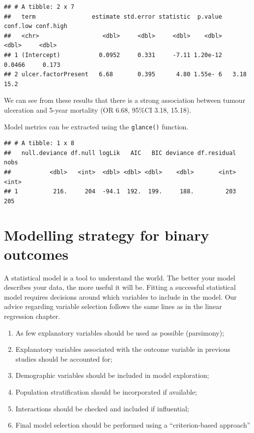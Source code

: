 \documentclass[
  12pt,
  krantz2]{krantz}
\makeatletter
\newenvironment{Shaded}{\begin{snugshade}}{\end{snugshade}}
\newcommand{\KeywordTok}[1]{\textcolor[rgb]{0.13,0.29,0.53}{\textbf{#1}}}
\newcommand{\NormalTok}[1]{#1}
\newcommand{\OperatorTok}[1]{\textcolor[rgb]{0.81,0.36,0.00}{\textbf{#1}}}
\newcommand{\StringTok}[1]{\textcolor[rgb]{0.31,0.60,0.02}{#1}}
\providecommand{\tightlist}{%
  \setlength{\itemsep}{0pt}\setlength{\parskip}{0pt}}
\newenvironment{kframe}{%
\medskip{}
\setlength{\fboxsep}{.8em}
 \def\at@end@of@kframe{}%
 \ifinner\ifhmode%
  \def\at@end@of@kframe{\end{minipage}}%
  \begin{minipage}{\columnwidth}%
 \fi\fi%
 \def\FrameCommand##1{\hskip\@totalleftmargin \hskip-\fboxsep
 \colorbox{shadecolor}{##1}\hskip-\fboxsep
     \hskip-\linewidth \hskip-\@totalleftmargin \hskip\columnwidth}%
 \MakeFramed {\advance\hsize-\width
   \@totalleftmargin\z@ \linewidth\hsize
   \@setminipage}}%
 {\par\unskip\endMakeFramed%
 \at@end@of@kframe}
\renewenvironment{Shaded}{\begin{kframe}}{\end{kframe}}
\makeatother
\begin{document}
\begin{verbatim}
## # A tibble: 2 x 7
##   term                estimate std.error statistic  p.value conf.low conf.high
##   <chr>                  <dbl>     <dbl>     <dbl>    <dbl>    <dbl>     <dbl>
## 1 (Intercept)           0.0952     0.331     -7.11 1.20e-12   0.0466     0.173
## 2 ulcer.factorPresent   6.68       0.395      4.80 1.55e- 6   3.18      15.2
\end{verbatim}

We can see from these results that there is a strong association between tumour ulceration and 5-year mortality (OR 6.68, 95\%CI 3.18, 15.18).

Model metrics can be extracted using the \texttt{glance()} function.

\begin{Shaded}
\end{Shaded}

\begin{verbatim}
## # A tibble: 1 x 8
##   null.deviance df.null logLik   AIC   BIC deviance df.residual  nobs
##           <dbl>   <int>  <dbl> <dbl> <dbl>    <dbl>       <int> <int>
## 1          216.     204  -94.1  192.  199.     188.         203   205
\end{verbatim}

\hypertarget{modelling-strategy-for-binary-outcomes}{%
\section{Modelling strategy for binary outcomes}\label{modelling-strategy-for-binary-outcomes}}


A statistical model is a tool to understand the world.
The better your model describes your data, the more useful it will be.
Fitting a successful statistical model requires decisions around which variables to include in the model.
Our advice regarding variable selection follows the same lines as in the linear regression chapter.

\begin{enumerate}
\def\labelenumi{\arabic{enumi}.}
\tightlist
\item
  As few explanatory variables should be used as possible (parsimony);
\item
  Explanatory variables associated with the outcome variable in previous studies should be accounted for;
\item
  Demographic variables should be included in model exploration;
\item
  Population stratification should be incorporated if available;
\item
  Interactions should be checked and included if influential;
\item
  Final model selection should be performed using a ``criterion-based approach''
\end{enumerate}
\end{document}
